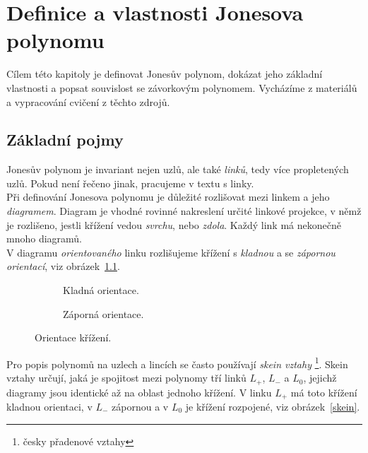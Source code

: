 
\chapter{Definice a vlastnosti Jonesova polynomu}
Cílem této kapitoly je definovat Jonesův polynom, dokázat jeho základní vlastnosti a popsat souvislost se závorkovým polynomem. Vycházíme z materiálů~\cite{cromwell2004knots, Adams2004, jones2005} a vypracování cvičení z těchto zdrojů.
\section{Základní pojmy}
Jonesův polynom je invariant nejen uzlů, ale také \emph{linků}, tedy více propletených uzlů. Pokud není řečeno jinak, pracujeme v textu s linky. \\
Při definování Jonesova polynomu je důležité rozlišovat mezi linkem a jeho \emph{diagramem}. Diagram je vhodné rovinné nakreslení určité linkové projekce, v němž je rozlišeno, jestli křížení vedou \emph{svrchu}, nebo \emph{zdola}. Každý link má nekonečně mnoho diagramů.
\\
V diagramu \emph{orientovaného} linku rozlišujeme křížení s \emph{kladnou} a se \emph{zápornou orientací}, viz obrázek~\ref{orientace}.

\begin{figure}[h]  

\centering 
\begin{subfigure}[t]{0.4\linewidth}\centering
{} 
\caption{Kladná orientace.} 
\end{subfigure}
\begin{subfigure}[t]{0.4\linewidth}\centering
{}  
\caption{Záporná orientace.}
\end{subfigure}
\caption{Orientace křížení.} \label{orientace}
\end{figure}  


Pro popis polynomů na uzlech a lincích se často používají \emph{skein vztahy} \footnote{česky přadenové vztahy}.
Skein vztahy určují, jaká je spojitost mezi polynomy tří linků $L_+$, $ L_-$ a $L_0$, jejichž diagramy jsou identické až na oblast jednoho křížení. V linku $L_+$ má toto křížení kladnou orientaci, v $L_-$ zápornou a v $L_0$ je křížení rozpojené, viz obrázek~\ref{skein}.

